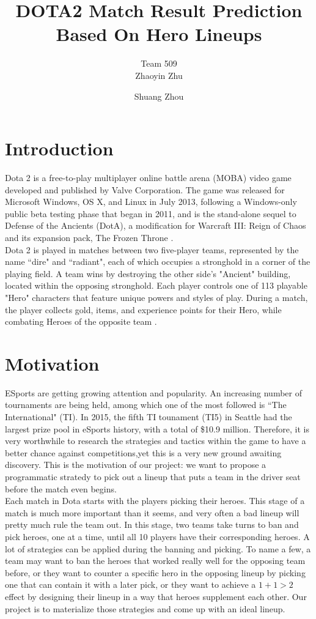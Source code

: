 \documentclass[11pt]{article}
\title{DOTA2 Match Result Prediction Based On Hero Lineups}
\author[1]{Team 509\\Zhaoyin Zhu}
\author[2]{Shuang Zhou}
\affil[1]{Division of Biostatistics, School of Medicine, New York University}
\affil[2]{Department of Computer Science, New York University}
\begin{document}
\maketitle

\section{Introduction}
Dota 2 is a free-to-play multiplayer online battle arena (MOBA) video game developed and published by Valve Corporation. The game was released for Microsoft Windows, OS X, and Linux in July 2013, following a Windows-only public beta testing phase that began in 2011, and is the stand-alone sequel to Defense of the Ancients (DotA), a modification for Warcraft III: Reign of Chaos and its expansion pack, The Frozen Throne \cite{dota2}.\\

\noindent Dota 2 is played in matches between two five-player teams, represented by the name ``dire" and ``radiant", each of which occupies a stronghold in a corner of the playing field. A team wins by destroying the other side's "Ancient" building, located within the opposing stronghold. Each player controls one of 113 playable "Hero" characters that feature unique powers and styles of play. During a match, the player collects gold, items, and experience points for their Hero, while combating Heroes of the opposite team \cite{dota2}.

\section{Motivation}
ESports are getting growing attention and popularity. An increasing number of tournaments are being held, among which one of the most followed is ``The International" (TI). In 2015, the fifth TI tounament (TI5) in Seattle had the largest prize pool in eSports history, with a total of \$10.9 million\cite{ti5}. Therefore, it is very worthwhile to research the strategies and tactics within the game to have a better chance against competitions,yet this is a very new ground awaiting discovery. This is the motivation of our project: we want to propose a programmatic stratedy to pick out a lineup that puts a team in the driver seat before the match even begins.\\

\noindent Each match in Dota starts with the players picking their heroes. This stage of a match is much more important than it seems, and very often a bad lineup will pretty much rule the team out. In this stage, two teams take turns to ban and pick heroes, one at a time, until all 10 players have their corresponding heroes. A lot of strategies can be applied during the banning and picking. To name a few, a team may want to ban the heroes that worked really well for the opposing team before, or they want to counter a specific hero in the opposing lineup by picking one that can contain it with a later pick, or they want to achieve a $1+1>2$ effect by designing their lineup in a way that heroes supplement each other. Our project is to materialize those strategies and come up with an ideal lineup.
\end{document}
